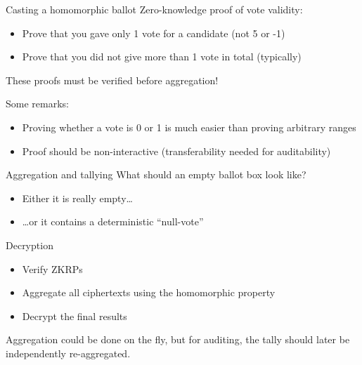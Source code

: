\begin{frame}{Casting a homomorphic ballot}
  Zero-knowledge proof of vote validity:
  \begin{itemize}[<+(1)->]
    \item Prove that you gave only 1 vote for a candidate (not 5 or -1)
    \item Prove that you did not give more than 1 vote in total (typically)
  \end{itemize}

  \pause
  These proofs must be verified before aggregation!

  \vspace*{1em}

  \pause
  Some remarks:
  \begin{itemize}[<+(1)->]
    \item Proving whether a vote is 0 or 1 is much easier than proving arbitrary ranges
    \item Proof should be non-interactive (transferability needed for auditability)
  \end{itemize}
\end{frame}

\begin{frame}{Aggregation and tallying}
  What should an empty ballot box look like?
  \begin{itemize}[<+(1)->]
    \item Either it is really empty\dots
    \item \dots{}or it contains a deterministic \enquote{null-vote}
  \end{itemize}

  \pause
  Decryption
  \begin{itemize}[<+(1)->]
    \item Verify ZKRPs
    \item Aggregate all ciphertexts using the homomorphic property
    \item Decrypt the final results
  \end{itemize}

  \pause
  Aggregation could be done on the fly, but for auditing, the tally should later be independently re-aggregated.
\end{frame}

